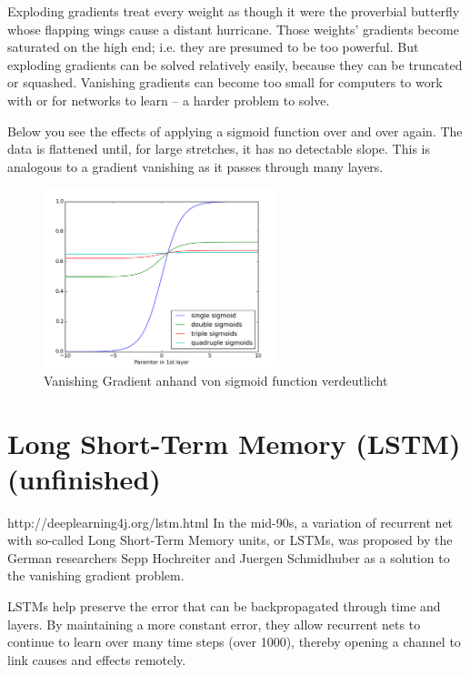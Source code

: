 {Exploding gradients treat every weight as though it were the proverbial butterfly whose flapping wings cause a distant hurricane. Those weights’ gradients become saturated on the high end; i.e. they are presumed to be too powerful. But exploding gradients can be solved relatively easily, because they can be truncated or squashed. Vanishing gradients can become too small for computers to work with or for networks to learn – a harder problem to solve.

Below you see the effects of applying a sigmoid function over and over again. The data is flattened until, for large stretches, it has no detectable slope. This is analogous to a gradient vanishing as it passes through many layers.

\renewcommand{\figurename}{Abb.}
\begin{figure}[htp]
\centering
\includegraphics[width=0.60\textwidth]{pictures/sigmoid_vanishing_gradient.png}
\caption[Sigmoid Funktion]{Vanishing Gradient anhand von sigmoid function verdeutlicht\protect\footnotemark}
\end{figure}


\section{Long Short-Term Memory (LSTM) (unfinished)}
http://deeplearning4j.org/lstm.html
In the mid-90s, a variation of recurrent net with so-called Long Short-Term Memory units, or LSTMs, was proposed by the German researchers Sepp Hochreiter and Juergen Schmidhuber as a solution to the vanishing gradient problem.

LSTMs help preserve the error that can be backpropagated through time and layers. By maintaining a more constant error, they allow recurrent nets to continue to learn over many time steps (over 1000), thereby opening a channel to link causes and effects remotely.

}
